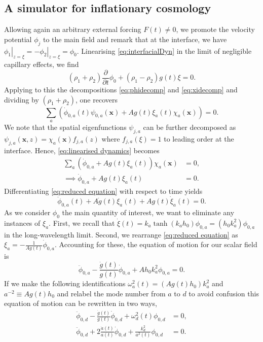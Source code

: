 \documentclass[a4paper]{jpconf}
\begin{document}
\subsection{A simulator for inflationary cosmology}
Allowing again an arbitrary external forcing $F(t)\neq0$, we promote the velocity potential $\phi_j$ to the main field and remark that at the interface, we have $\left.\phi_1\right|_{z=\xi}=-\left.\phi_2\right|_{z=\xi}=\phi_0$. Linearising \eqref{eq:interfacialDyn} in the limit of negligible capillary effects, we find
\begin{equation}
    (\rho_1+\rho_2)\frac{\partial}{\partial t}\phi_0+(\rho_1-\rho_2)g(t)\xi=0.
\end{equation} Applying to this the decompositions \eqref{eq:phidecomp} and \eqref{eq:xidecomp} and dividing by $(\rho_1+\rho_2)$, one recovers
\begin{equation}\label{eq:linearised dynamics}
\sum_a\left(\dot{\phi}_{0,a}(t)\psi_{0,a}(\bm{x})+Ag(t)\xi_a(t)\chi_a(\bm{x})\right)=0.
\end{equation} We note that the spatial eigenfunctions $\psi_{j,a}$ can be further decomposed as $\psi_{j,a}(\bm{x},z)=\chi_a(\bm{x})f_{j,a}(z)$ where $f_{j,a}(\xi)= 1$ to leading order at the interface. Hence, \eqref{eq:linearised dynamics} becomes
\begin{align}
    \sum_a\left(\dot{\phi}_{0,a}+Ag(t)\xi_a(t)\right)\chi_a(\bm{x})&=0,\\
    \implies \dot{\phi}_{0,a}+Ag(t)\xi_a(t)&=0.\label{eq:reduced equation}
\end{align}
Differentiating \eqref{eq:reduced equation} with respect to time yields
\begin{equation}
    \ddot{\phi}_{0,a}(t)+A\dot{g}(t)\xi_a(t)+Ag(t)\dot{\xi}_a(t)=0.
\end{equation} As we consider $\phi_0$ the main quantity of interest, we want to eliminate any instances of $\xi_a$. First, we recall that $\dot{\xi}(t)=k_a\tanh(k_ah_0)\phi_{0,a}=(h_0k_a^2)\phi_{0,a}$ in the long-wavelength limit. Second, we rearrange \eqref{eq:reduced equation} as $\xi_a=-\tfrac{1}{Ag(t)}\dot{\phi}_{0,a}$. Accounting for these, the equation of motion for our scalar field is
\begin{equation}
    \ddot{\phi}_{0,a}-\frac{\dot{g}(t)}{g(t)}\dot{\phi}_{0,a}+Ah_0k_a^2\phi_{0,a}=0.
\end{equation} If we make the following identifications $\omega_a^2(t)=(Ag(t)h_0)k_a^2$ and $a^{-2}\equiv Ag(t)h_0$ and relabel the mode number from $a$ to $d$ to avoid confusion this equation of motion can be rewritten in two ways,
\begin{subequations}
    \begin{align}
      \ddot{\phi}_{0,d}-\frac{\dot{g}(t)}{g(t)}\dot{\phi}_{0,d}+\omega_d^2(t)\phi_{0,d}&=0,\\
      \ddot{\phi}_{0,d}+2\frac{\dot{a}(t)}{a(t)}\dot{\phi}_{0,d}+\frac{k^2_d}{a^2(t)}\phi_{0,d}&=0.\label{eq:FLRW scalar field}
    \end{align}
\end{subequations}
\end{document}
